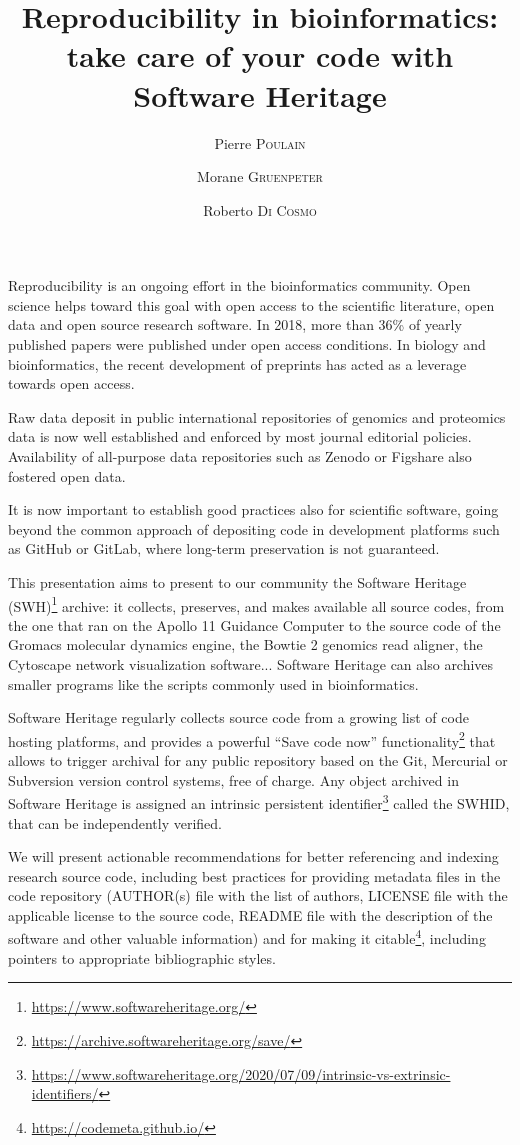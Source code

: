 \documentclass[poster, final]{jobim}
\title{Reproducibility in bioinformatics: take care of your code with Software Heritage}
\author{Pierre \textsc{Poulain}\inst{1} \and Morane \textsc{Gruenpeter}\inst{2} \and Roberto \textsc{Di Cosmo}\inst{3}}
\institute{
	Université de Paris, CNRS, Institut Jacques Monod, F-75006, Paris, France
	\and
	Software Heritage, Inria, France
	\and
	Software Heritage, Inria and University of Paris, France
}
\begin{document}

\maketitle

\setcounter{footnote}{0}

Reproducibility is an ongoing effort in the bioinformatics community\cite{kim2018}. Open science helps toward this goal with open access to the scientific literature, open data and
open source research software. In 2018, more than 36\% of yearly published papers were published under open access conditions\cite{trendsopenaccesspublications}. In biology and bioinformatics, the recent development of preprints has acted as a leverage towards open access.

Raw data deposit in public international repositories of genomics and proteomics data is now well established and enforced by most journal editorial policies. Availability of all-purpose data repositories such as Zenodo or Figshare also fostered open data.

It is now important to establish good practices also for scientific software,
going beyond the common approach of depositing code in development platforms
such as GitHub or GitLab, where long-term preservation is not guaranteed.

This presentation aims to present to our community the Software Heritage (SWH)\footnote{\url{https://www.softwareheritage.org/}} archive\cite{dicosmo2017}: it collects, preserves, and makes available all source codes, from the one that ran on the Apollo 11 Guidance Computer to the source code of the Gromacs molecular dynamics engine, the Bowtie 2 genomics read aligner, the Cytoscape network visualization software... Software Heritage can also archives smaller programs like the scripts commonly used in bioinformatics.

Software Heritage regularly collects source code from a growing list of code
hosting platforms, and provides a powerful “Save code now” functionality\footnote{\url{https://archive.softwareheritage.org/save/}} that allows to trigger archival for any
public repository based on the Git, Mercurial or Subversion version control systems, free of charge. Any object archived in Software Heritage is assigned an intrinsic persistent identifier\footnote{\url{https://www.softwareheritage.org/2020/07/09/intrinsic-vs-extrinsic-identifiers/}} called the SWHID\cite{dicosmo2020},
that can be independently verified.

We will present actionable recommendations for better referencing and indexing research source code, including best practices for providing metadata files in the code repository (AUTHOR(s) file with the list of authors, LICENSE file with the applicable license to the source code, README file with the description of the software and other valuable information) and for making it citable\footnote{\url{https://codemeta.github.io/}}, including pointers to appropriate bibliographic styles\cite{dicosmo2020}.


\printbibliography
 
\end{document}
